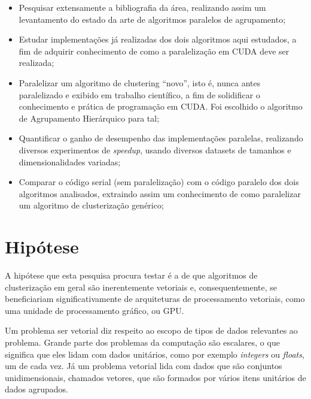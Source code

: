 \documentclass[12pt,
openright, 
oneside, %
a4paper,    %
brazil]{facom-ufu-abntex2}
\def\qntAlgrtm{dois}
\begin{document}
\begin{itemize}
  \item Pesquisar extensamente a bibliografia da área, realizando assim um levantamento do estado da arte de algoritmos paralelos de agrupamento;
  
  \item Estudar implementações já realizadas dos \qntAlgrtm{} algoritmos aqui estudados, a fim de adquirir conhecimento de como a paralelização em CUDA deve ser realizada;
  
  \item Paralelizar um algoritmo de clustering \enquote{novo}, isto é, nunca antes paralelizado e exibido em trabalho científico, a fim de solidificar o conhecimento e prática de programação em CUDA. Foi escolhido o algoritmo de Agrupamento Hierárquico para tal;
  
  \item Quantificar o ganho de desempenho das implementações paralelas, realizando diversos experimentos de \textit{speedup}, usando diversos datasets de tamanhos e dimensionalidades variadas;
  
  \item Comparar o código serial (sem paralelização) com o código paralelo dos \qntAlgrtm{} algoritmos analisados, extraindo assim um conhecimento de como paralelizar um algoritmo de clusterização genérico;
\end{itemize}




\section{Hipótese}

A hipótese que esta pesquisa procura testar é a de que algoritmos de clusterização em geral são inerentemente vetoriais e, consequentemente, se beneficiariam significativamente de arquiteturas de processamento vetoriais, como uma unidade de processamento gráfico, ou GPU.

Um problema ser vetorial diz respeito ao escopo de tipos de dados relevantes ao problema. Grande parte dos problemas da computação são escalares, o que significa que eles lidam com dados unitários, como por exemplo \textit{integers} ou \textit{floats}, um de cada vez. Já um problema vetorial lida com dados que são conjuntos unidimensionais, chamados vetores, que são formados por vários itens unitários de dados agrupados.
\end{document}

